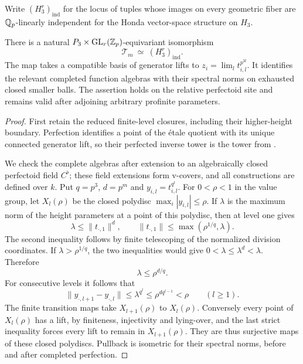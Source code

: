 Write $(H_3^r)_{\mathrm{ind}}$ for the locus of tuples whose
images on every geometric fiber are $\mathbb Q_p$-linearly independent
for the Honda vector-space structure on $H_3$.

\begin{theorem}\label{h3:thm:coordinate-comparison}
There is a natural $P_3\times\operatorname{GL}_r(\mathbb Z_p)$-equivariant isomorphism
\[
 \mathcal T_m\ \simeq\ (H_3^r)_{\mathrm{ind}}.
\]
The map takes a compatible basis of generator lifts to
$z_i=\lim_l t_{i,l}^{p^{3l}}$.  It identifies the relevant completed
function algebras with their spectral norms on exhausted closed
smaller balls.  The assertion holds on the relative perfectoid site
and remains valid after adjoining arbitrary profinite parameters.
\end{theorem}

\begin{proof}
First retain the reduced finite-level closures, including their
higher-height boundary.  Perfection identifies a point of the
\'etale quotient with its unique connected generator lift, so their
perfected inverse tower is the tower from
.

We check the complete algebras after extension to an algebraically
closed perfectoid field $C^\flat$; these field extensions form
v-covers, and all constructions are defined over $k$.
Put $q=p^3$, $d=p^m$ and $y_{i,l}=t_{i,l}^{q^l}$.
For $0<\rho<1$ in the value group, let $X_l(\rho)$ be the closed
polydisc $\max_i|y_{i,l}|\leq\rho$.  If $\lambda$ is the maximum
norm of the height parameters at a point of this polydisc, then
 at level one gives
\[
 \lambda\leq\|t_{\cdot,1}\|^d,\qquad
 \|t_{\cdot,1}\|\leq\max(\rho^{1/q},\lambda).
\]
The second inequality follows by finite telescoping of the normalized
division coordinates.  If $\lambda>\rho^{1/q}$, the two inequalities
would give $0<\lambda\leq\lambda^d<\lambda$.  Therefore
\begin{equation}\label{h3:geom:uniform-radius}
 \lambda\leq\rho^{d/q}.
\end{equation}
For consecutive levels it follows that
\[
 \|y_{\cdot,l+1}-y_{\cdot,l}\|
       \leq\lambda^{q^l}
       \leq\rho^{d q^{l-1}}<\rho\qquad(l\geq1).
\]
The finite transition maps take $X_{l+1}(\rho)$ to $X_l(\rho)$.
Conversely every point of $X_l(\rho)$ has a lift, by finiteness,
injectivity and lying-over, and the last strict inequality forces
every lift to remain in $X_{l+1}(\rho)$.  They are thus surjective
maps of these closed polydiscs.  Pullback is isometric for their
spectral norms, before and after completed perfection.


\end{proof}
